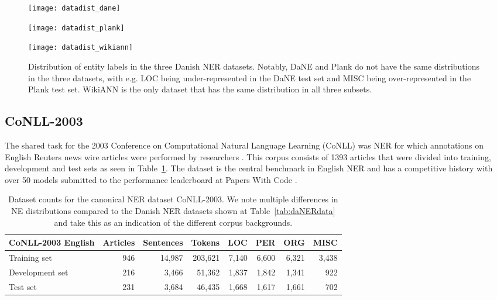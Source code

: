 \documentclass[main.tex]{subfiles}
\begin{document}
\begin{figure}[H]
    \centering
   	\begin{minipage}[t]{0.32\textwidth}
       \texttt{[image: datadist\_dane]}
    \end{minipage}\hfill
    \begin{minipage}[t]{0.32\textwidth}
        \texttt{[image: datadist\_plank]}
    \end{minipage}\hfill
    \begin{minipage}[t]{0.32\textwidth}
        \texttt{[image: datadist\_wikiann]}
    \end{minipage}
    \caption{
        Distribution of entity labels in the three Danish NER datasets.
        Notably, DaNE and Plank do not have the same distributions in the three datasets, with e.g. LOC being under-represented in the DaNE test set and MISC being over-represented in the Plank test set.
        WikiANN is the only dataset that has the same distribution in all three subsets.
    }
    \label{fig:dadatadist}
\end{figure}\noindent

\subsection{CoNLL-2003}
The shared task for the 2003 Conference on Computational Natural Language Learning (CoNLL) was NER for which annotations on English Reuters news wire articles were performed by researchers \cite{tjang2003conll}.
This corpus consists of 1393 articles that were divided into training, development and test sets as seen in Table~\ref{tab:conll2003}.
The dataset is the central benchmark in English NER \cite[Sec. 4.3]{yamada2020luke} and has a competitive history with over 50 models submitted to the performance leaderboard at Papers With Code \footnotemark.
\begin{table}[H]
    \centering
    \begin{tabular}{l|rrr|rrrr}
    CoNLL-2003 English  & Articles  & Sentences  & Tokens   & LOC   & PER   & ORG   & MISC  \\ \hline
    Training set        & 946       & 14,987     & 203,621  & 7,140  & 6,600  & 6,321  & 3,438   \\
    Development set     & 216       & 3,466      & 51,362   & 1,837  & 1,842  & 1,341  & 922    \\
    Test set            & 231       & 3,684      & 46,435   & 1,668  & 1,617  & 1,661  & 702    \\
    \end{tabular}
    \caption{
        Dataset counts for the canonical NER dataset CoNLL-2003.
        We note multiple differences in NE distributions compared to the Danish NER datasets shown at Table~\ref{tab:daNERdata} and take this as an indication of the different corpus backgrounds.
    }
    \label{tab:conll2003}
\end{table}
\end{document}
